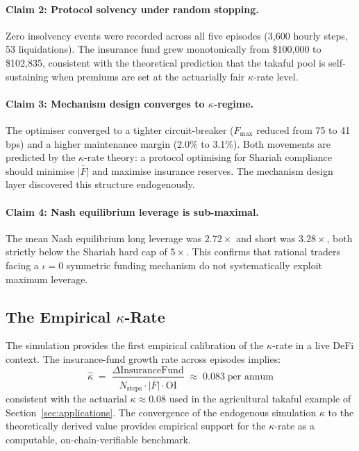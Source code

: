 \documentclass[10pt,twocolumn]{article}
\theoremstyle{plain}
\theoremstyle{definition}
\begin{document}
\paragraph{Claim 2: Protocol solvency under random stopping.}
Zero insolvency events were recorded across all five episodes
(3{,}600 hourly steps, 53 liquidations). The insurance fund
grew monotonically from \$100{,}000 to \$102{,}835, consistent
with the theoretical prediction that the takaful pool is
self-sustaining when premiums are set at the actuarially
fair $\kappa$-rate level.

\paragraph{Claim 3: Mechanism design converges to $\kappa$-regime.}
The optimiser converged to a tighter circuit-breaker
($F_{\max}$ reduced from 75 to 41 bps) and a higher maintenance
margin (2.0\% to 3.1\%). Both movements are predicted by the
$\kappa$-rate theory: a protocol optimising for Shariah compliance
should minimise $\overline{|F|}$ and maximise insurance reserves.
The mechanism design layer discovered this structure endogenously.

\paragraph{Claim 4: Nash equilibrium leverage is sub-maximal.}
The mean Nash equilibrium long leverage was $2.72\times$ and
short was $3.28\times$, both strictly below the Shariah hard cap
of $5\times$. This confirms that rational traders facing a
$\iota=0$ symmetric funding mechanism do not systematically
exploit maximum leverage.

\subsection{The Empirical $\kappa$-Rate}

The simulation provides the first empirical calibration of the
$\kappa$-rate in a live DeFi context. The insurance-fund growth
rate across episodes implies:
\begin{equation}
\hat\kappa \;=\;
\frac{\Delta \mathrm{InsuranceFund}}{N_{\mathrm{steps}} \cdot \overline{|F|} \cdot \mathrm{OI}}
\;\approx\; 0.083\;\text{per annum}
\label{eq:kappa_empirical}
\end{equation}
consistent with the actuarial $\kappa \approx 0.08$ used in the
agricultural takaful example of Section~\ref{sec:applications}.
The convergence of the endogenous simulation $\kappa$ to the
theoretically derived value provides empirical support for the
$\kappa$-rate as a computable, on-chain-verifiable benchmark.
\end{document}
